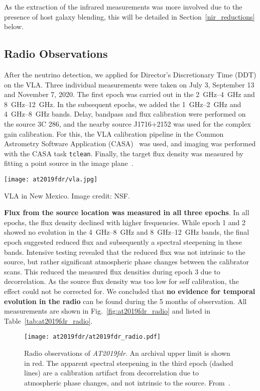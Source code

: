 As the extraction of the infrared measurements was more involved due to the presence of host galaxy blending, this will be detailed in Section~\ref{nir_reductions} below.

\subsection{Radio Observations}
After the neutrino detection, we applied for Director's Discretionary Time (DDT) on the VLA. Three individual measurements were taken on July 3, September 13 and November 7, 2020. The first epoch was carried out in the \SIrange{2}{4}{\giga\Hz} and \SIrange{8}{12}{\giga\Hz}. In the subsequent epochs, we added the \SIrange{1}{2}{\giga\Hz} and \SIrange{4}{8}{\giga\Hz} bands. Delay, bandpass and flux calibration were performed on the source 3C 286, and the nearby source J1716+2152 was used for the complex gain calibration. For this, the VLA calibration pipeline in the Common Astrometry Software Application (CASA)~ was used, and imaging was performed with the CASA task \texttt{tclean}. Finally, the target flux density was measured by fitting a point source in the image plane~\cite{Reusch2022}.

\begin{marginfigure}
    \texttt{[image: at2019fdr/vla.jpg]}
    \caption[VLA]{VLA in New Mexico. Image credit: NSF.}
\end{marginfigure}

\textbf{Flux from the source location was measured in all three epochs}. In all epochs, the flux density declined with higher frequencies. While epoch 1 and 2 showed no evolution in the \SIrange{4}{8}{\giga\Hz} and \SIrange{8}{12}{\giga\Hz} bands, the final epoch suggested reduced flux and subsequently a spectral steepening in these bands. Intensive testing revealed that the reduced flux was not intrinsic to the source, but rather significant atmospheric phase changes between the calibrator scans. This reduced the measured flux densities during epoch 3 due to decorrelation. As the source flux density was too low for self calibration, the effect could not be corrected for. We concluded that \textbf{no evidence for temporal evolution in the radio} can be found during the 5 months of observation. All measurements are shown in Fig.~\ref{fig:at2019fdr_radio} and listed in Table~\ref{tab:at2019fdr_radio}.

\begin{figure}[htb]
    \texttt{[image: at2019fdr/at2019fdr\_radio.pdf]}
    \caption[\emph{AT2019fdr} radio observations]{Radio observations of \emph{AT2019fdr}. An archival upper limit is shown in red. The apparent spectral steepening in the third epoch (dashed lines) are a calibration artifact from decorrelation due to atmospheric phase changes, and not intrinsic to the source. From~\cite{Reusch2022}.}
\end{figure}

